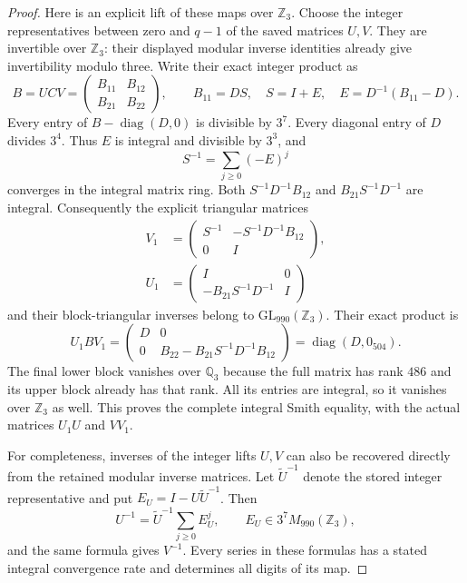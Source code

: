 \begin{proof}
Here is an explicit lift of these maps over
$\mathbb Z_3$. Choose the integer representatives
between zero and $q-1$ of the saved matrices $U,V$.
They are invertible over $\mathbb Z_3$: their displayed
modular inverse identities already give invertibility
modulo three. Write their exact integer product as
\[
 B=UCV=\begin{pmatrix}B_{11}&B_{12}\\B_{21}&B_{22}\end{pmatrix},
 \qquad B_{11}=D S,\quad
 S=I+E,\quad E=D^{-1}(B_{11}-D).
 \tag{E102.6}
\]
Every entry of $B-\operatorname{diag}(D,0)$ is divisible
by $3^7$. Every diagonal entry of $D$ divides $3^4$.
Thus $E$ is integral and divisible by $3^3$, and
\[
 S^{-1}=\sum_{j\ge0}(-E)^j
 \tag{E102.7}
\]
converges in the integral matrix ring.
Both $S^{-1}D^{-1}B_{12}$ and
$B_{21}S^{-1}D^{-1}$ are integral.
Consequently the explicit triangular matrices
\[
 \begin{aligned}
 V_1&=\begin{pmatrix}
 S^{-1}&-S^{-1}D^{-1}B_{12}\\0&I
 \end{pmatrix},\\
 U_1&=\begin{pmatrix}
 I&0\\-B_{21}S^{-1}D^{-1}&I
 \end{pmatrix}
 \end{aligned}
 \tag{E102.8}
\]
and their block-triangular inverses belong to
$\mathrm{GL}_{990}(\mathbb Z_3)$.
Their exact product is
\[
 U_1 B V_1=
 \begin{pmatrix}
 D&0\\0&B_{22}-B_{21}S^{-1}D^{-1}B_{12}
 \end{pmatrix}
       =\operatorname{diag}(D,0_{504}).
 \tag{E102.9}
\]
The final lower block vanishes over $\mathbb Q_3$
because the full matrix has rank $486$ and its
upper block already has that rank. All its entries
are integral, so it vanishes over $\mathbb Z_3$ as well.
This proves the complete integral Smith equality,
with the actual matrices $U_1U$ and $VV_1$.

For completeness, inverses of the integer lifts $U,V$
can also be recovered directly from the retained
modular inverse matrices. Let $\widetilde U^{-1}$
denote the stored integer representative and put
$E_U=I-U\widetilde U^{-1}$. Then
\[
 U^{-1}=\widetilde U^{-1}
             \sum_{j\ge0}E_U^j,
       \qquad E_U\in3^7M_{990}(\mathbb Z_3),
 \tag{E102.10}
\]
and the same formula gives $V^{-1}$.
Every series in these formulas has a stated integral
convergence rate and determines all digits of its map.


\end{proof}
